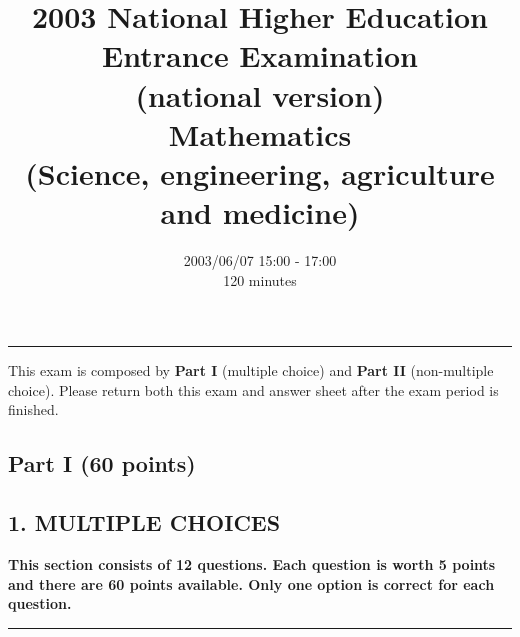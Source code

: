 \documentclass[letterpaper,10pt,addpoints]{exam}
\author{}
\newcommand{\content}{2003 National Higher Education Entrance Examination\\(national version)\\\bigskip \textbf{Mathematics}\\ (Science, engineering, agriculture and medicine)}
\newcommand{\examdate}{2003/06/07 15:00 - 17:00}
\newcommand{\timelimit}{120 minutes}
\begin{document}
\vspace*{\fill}
\begin{center}
\begin{minipage}{\textwidth}
\title{\Large \content}
\date{\examdate\\ \timelimit}
\maketitle

\noindent \rule{\textwidth}{1pt}

\noindent This exam is composed by \textbf{Part I} (multiple choice) and \textbf{Part II} (non-multiple choice). Please return both this exam and answer sheet after the exam period is finished.
\end{minipage}
\end{center}
\vfill 




\clearpage
\begin{center}
\section*{Part I (60 points)}
\end{center}
\subsection*{1. MULTIPLE CHOICES}
\large{\textbf{This section consists of 12 questions. Each question is worth 5 points and there are 60 points available. Only one option is correct for each question.}\\}
\noindent \rule{\textwidth}{1pt}
\end{document}
